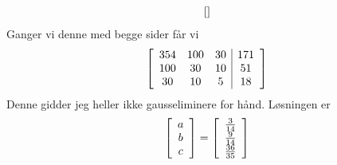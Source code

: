 \documentclass[11pt, a4paper, norsk]{NTNUoving}
\newenvironment{pkt}{\begin{punkt}}{\end{punkt}}
\newenvironment{matrise}[1][c]
{
\left[\begin{array}{#1}
}
{    
\end{array}\right]           
}
\begin{document}
\begin{oppgave}
\begin{pkt}
\begin{align*}
\begin{matrise}[ccccc]
            \end{matrise}
        \end{align*}
        Ganger vi denne med begge sider får vi
        \begin{align*}
            \begin{matrise}[ccc|c]
                354 & 100 & 30 & 171 \\
                100 & 30 & 10 & 51 \\
                30 & 10 & 5 & 18
            \end{matrise}
        \end{align*}
        Denne gidder jeg heller ikke gausseliminere for hånd. Løsningen er $$\begin{matrise}
        a\\b\\c
        \end{matrise} = \begin{matrise}
        \frac{3}{14} \\ \frac{9}{14} \\ \frac{36}{35}
        \end{matrise}$$
    \end{pkt}
\end{oppgave}
\end{document}
